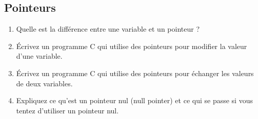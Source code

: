 \subsection{Pointeurs}
\begin{enumerate}
	\item Quelle est la différence entre une variable et un pointeur ?
	\item Écrivez un programme C qui utilise des pointeurs pour modifier la valeur d'une variable.
		
			
			
			
			
	
	\item Écrivez un programme C qui utilise des pointeurs pour échanger les valeurs de deux variables.
		
		
			
			
			
			
	
	\item Expliquez ce qu'est un pointeur nul (null pointer) et ce qui se passe si vous tentez d'utiliser un pointeur nul.
\end{enumerate}

